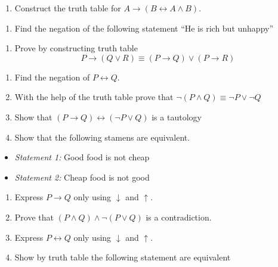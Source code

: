 \documentclass[]{book}
\providecommand{\tightlist}{%
  \setlength{\itemsep}{0pt}\setlength{\parskip}{0pt}}
\begin{document}
\begin{enumerate}
\def\labelenumi{\arabic{enumi}.}
\setcounter{enumi}{6}
\tightlist
\item
  Construct the truth table for \(A \rightarrow ( B\leftrightarrow A \land B).\)
\end{enumerate}

\begin{enumerate}
\def\labelenumi{\arabic{enumi}.}
\setcounter{enumi}{7}
\tightlist
\item
  Find the negation of the following statement ``He is rich but unhappy''
\end{enumerate}

\begin{enumerate}
\def\labelenumi{\arabic{enumi}.}
\setcounter{enumi}{8}
\tightlist
\item
  Prove by constructing truth table
  \[P \rightarrow(Q \lor R) \equiv (P \rightarrow Q) \lor (P \rightarrow R)\]
\end{enumerate}

\begin{enumerate}
\def\labelenumi{\arabic{enumi}.}
\setcounter{enumi}{9}
\item
  Find the negation of \(P \leftrightarrow Q.\)
\item
  With the help of the truth table prove that \(\lnot (P \land Q) \equiv \lnot P\lor \lnot Q\)
\item
  Show that \((P \rightarrow Q) \leftrightarrow (\lnot P \lor Q)\) is a tautology
\item
  Show that the following stamens are equivalent.
\end{enumerate}

\begin{itemize}
\item
  \emph{Statement 1:} Good food is not cheap
\item
  \emph{Statement 2:} Cheap food is not good
\end{itemize}

\begin{enumerate}
\def\labelenumi{\arabic{enumi}.}
\setcounter{enumi}{13}
\item
  Express \(P\rightarrow Q\) only using \(\downarrow\) and \(\uparrow\).
\item
  Prove that \((P \land Q) \land \lnot (P \lor Q)\) is a contradiction.
\item
  Express \(P \leftrightarrow Q\) only using \(\downarrow\) and \(\uparrow\).
\item
  Show by truth table the following statement are equivalent
\end{enumerate}
\end{document}
